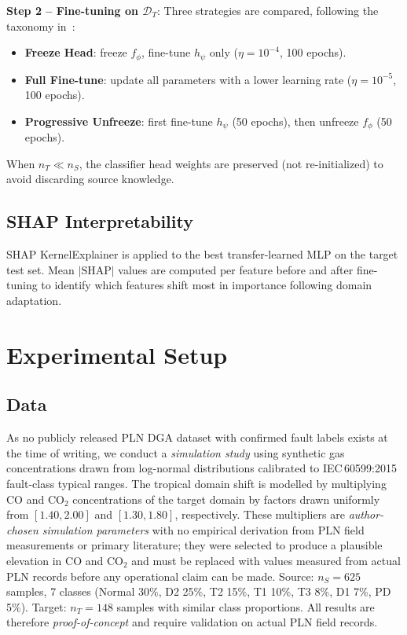 \documentclass[conference]{IEEEtran}
\begin{document}
\textbf{Step 2 -- Fine-tuning on $\mathcal{D}_T$}:
Three strategies are compared, following the taxonomy
in~\cite{DladlaThango2025}:
\begin{itemize}
  \item \textbf{Freeze Head}: freeze $f_\phi$,
        fine-tune $h_\psi$ only ($\eta = 10^{-4}$, 100 epochs).
  \item \textbf{Full Fine-tune}: update all parameters with a
        lower learning rate ($\eta = 10^{-5}$, 100 epochs).
  \item \textbf{Progressive Unfreeze}: first fine-tune $h_\psi$
        (50 epochs), then unfreeze $f_\phi$ (50 epochs).
\end{itemize}
When $n_T \ll n_S$, the classifier head weights are preserved
(not re-initialized) to avoid discarding source knowledge.

\subsection{SHAP Interpretability}
SHAP KernelExplainer is applied to the best transfer-learned MLP on
the target test set.
Mean $|\text{SHAP}|$ values are computed per feature before and after
fine-tuning to identify which features shift most in importance
following domain adaptation.

\section{Experimental Setup}
\label{sec:setup}

\subsection{Data}
As no publicly released PLN DGA dataset with confirmed fault labels
exists at the time of writing, we conduct a \emph{simulation study}
using synthetic gas concentrations drawn from log-normal distributions
calibrated to IEC\,60599:2015 fault-class typical ranges.
The tropical domain shift is modelled by multiplying CO and
CO$_2$ concentrations of the target domain by factors drawn
uniformly from $[1.40, 2.00]$ and $[1.30, 1.80]$, respectively.
These multipliers are \emph{author-chosen simulation parameters}
with no empirical derivation from PLN field measurements or
primary literature; they were selected to produce a plausible
elevation in CO and CO$_2$ and must be replaced with values
measured from actual PLN records before any operational claim
can be made.
Source: $n_S = 625$ samples, 7 classes (Normal 30\%, D2 25\%,
T2 15\%, T1 10\%, T3 8\%, D1 7\%, PD 5\%).
Target: $n_T = 148$ samples with similar class proportions.
All results are therefore \emph{proof-of-concept} and require
validation on actual PLN field records.
\end{document}
